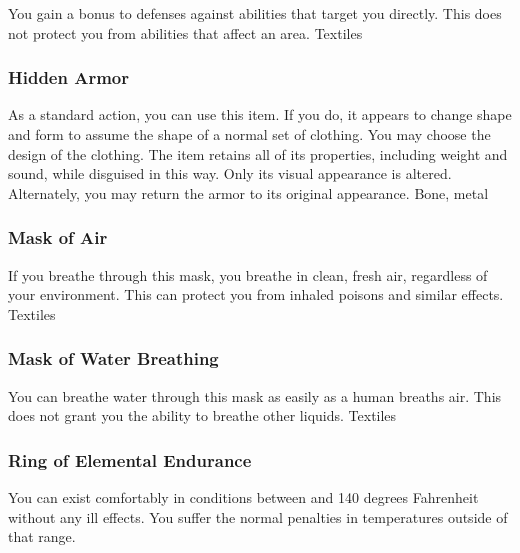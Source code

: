 You gain a  bonus to defenses against  abilities that target you directly.
This does not protect you from abilities that affect an area.
 
 Textiles
\lowercase{\hypertarget{item:Hidden Armor}{}}\label{item:Hidden Armor}
\hypertarget{item:Hidden Armor}{\subsubsection{Hidden Armor\hfill{}}}
As a standard action, you can use this item.
If you do, it appears to change shape and form to assume the shape of a normal set of clothing.
You may choose the design of the clothing.
The item retains all of its properties, including weight and sound, while disguised in this way.
Only its visual appearance is altered.
Alternately, you may return the armor to its original appearance.
 
 Bone, metal
\lowercase{\hypertarget{item:Mask of Air}{}}\label{item:Mask of Air}
\hypertarget{item:Mask of Air}{\subsubsection{Mask of Air\hfill{}}}
If you breathe through this mask, you breathe in clean, fresh air, regardless of your environment.
This can protect you from inhaled poisons and similar effects.
 
 Textiles
\lowercase{\hypertarget{item:Mask of Water Breathing}{}}\label{item:Mask of Water Breathing}
\hypertarget{item:Mask of Water Breathing}{\subsubsection{Mask of Water Breathing\hfill{}}}
You can breathe water through this mask as easily as a human breaths air.
This does not grant you the ability to breathe other liquids.
 
 Textiles
\lowercase{\hypertarget{item:Ring of Elemental Endurance}{}}\label{item:Ring of Elemental Endurance}
\hypertarget{item:Ring of Elemental Endurance}{\subsubsection{Ring of Elemental Endurance\hfill{}}}
You can exist comfortably in conditions between  and 140 degrees Fahrenheit without any ill effects.
You suffer the normal penalties in temperatures outside of that range.
